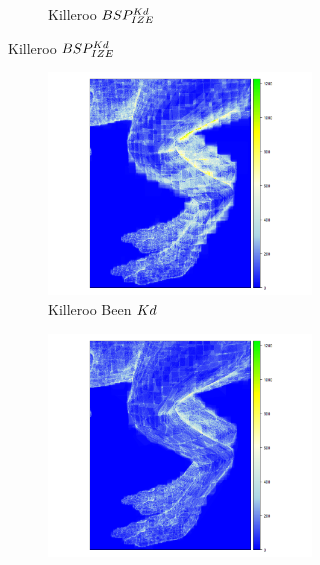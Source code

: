 \begin{figure}
\begin{subfigure}{0.5\textwidth}
\begin{subfigure}{\textwidth}
            \caption{Killeroo $BSP^{Kd}_{IZE}$}
            \label{fig:killeroo-bspize-heatmap}    
        \end{subfigure}
    \end{subfigure}
    \begin{subfigure}{0.5\textwidth}
        \centering
        \begin{subfigure}{\textwidth}
            \centering
            \includegraphics[width=1\linewidth]{img/killeroo-feet-kd-heatmap}
            \caption{Killeroo Been $Kd$}
            \label{fig:killeroo-been-kd-heatmap}    
        \end{subfigure}
        \begin{subfigure}{\textwidth}
            \centering
            \includegraphics[width=1\linewidth]{img/killeroo-feet-bspize-heatmap}

\end{subfigure}
\end{subfigure}
\end{figure}
